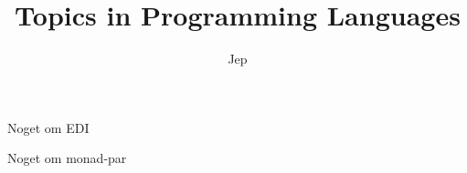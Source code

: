 \documentclass[12pt, danish]{beamer}
\title{Topics in Programming Languages}
\author{Jep}
\begin{document}
\begin{frame}
\maketitle
\end{frame}

\begin{frame}
Noget\pause{} om\pause{} EDI
\end{frame}

\begin{frame}
Noget\pause{} om\pause{} monad-par
\end{frame}
\end{document}
